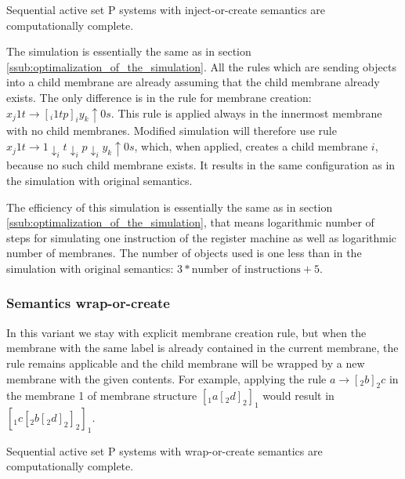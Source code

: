 
    \begin{veta}
      Sequential active set P systems with inject-or-create semantics are computationally complete.
    \end{veta}

    \begin{dokaz}
      The simulation is essentially the same as in section \ref{ssub:optimalization_of_the_simulation}. All the rules which are sending objects into a child membrane are already assuming that the child membrane already exists. The only difference is in the rule for membrane creation: $x_j1t \rightarrow [_i 1tp]_iy_k\uparrow 0s$. This rule is applied always in the innermost membrane with no child membranes. Modified simulation will therefore use rule $x_j1t \rightarrow 1\downarrow_i t\downarrow_i p\downarrow_i y_k\uparrow 0s$, which, when applied, creates a child membrane $i$, because no such child membrane exists. It results in the same configuration as in the simulation with original semantics. 
    \end{dokaz}

    The efficiency of this simulation is essentially the same as in section \ref{ssub:optimalization_of_the_simulation}, that means logarithmic number of steps for simulating one instruction of the register machine as well as logarithmic number of membranes. The number of objects used is one less than in the simulation with original semantics: $3 * \text{number of instructions} + 5$.


  \subsubsection{Semantics wrap-or-create} %
  \label{ssub:semantics_wrap_or_create}
    
    In this variant we stay with explicit membrane creation rule, but when the membrane with the same label is already contained in the current membrane, the rule remains applicable and the child membrane will be wrapped by a new membrane with the given contents. For example, applying the rule $a \rightarrow [_2 b ]_2 c$ in the membrane 1 of membrane structure $[_1 a [_2 d ]_2 ]_1$ would result in $[_1 c [_2 b [_2 d ]_2 ]_2 ]_1$.


    \begin{veta}
      Sequential active set P systems with wrap-or-create semantics are computationally complete.
    \end{veta}

